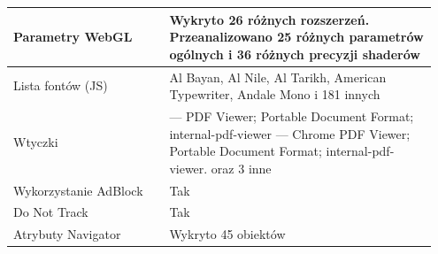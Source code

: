 \begin{table}[p]
\begin{tabular}{|p{0.35\linewidth} | p{0.6\linewidth}|}
        Parametry WebGL              & Wykryto 26 różnych rozszerzeń. Przeanalizowano 25 różnych parametrów ogólnych i 36 różnych precyzji shaderów                                                                                                                                                                                                                                                                                                                                  \\ \hline
        Lista fontów (JS)            & Al Bayan, Al Nile, Al Tarikh, American Typewriter, Andale Mono i 181 innych                                                                                                                                                                                                                                                                                                                                                                   \\ \hline
        Wtyczki &
        --- PDF Viewer; Portable Document Format; internal-pdf-viewer\newline
        --- Chrome PDF Viewer; Portable Document Format; internal-pdf-viewer.\newline
        oraz 3 inne \\ \hline
        Wykorzystanie AdBlock        & Tak                                                                                                                                                                                                                                                                                                                                                                                                                                           \\ \hline
        Do Not Track                 & Tak                                                                                                                                                                                                                                                                                                                                                                                                                                           \\ \hline
        Atrybuty Navigator           & Wykryto 45 obiektów                                                                                                                                                                                                                                                                                                                                                                                                                           \\ \hline

\end{tabular}
\end{table}
